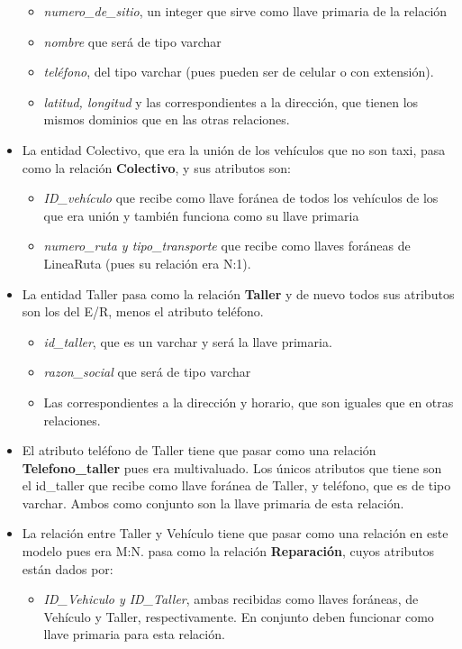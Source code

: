 \documentclass[11pt]{article}
\begin{document}
\begin{itemize}
    \begin{itemize}
    \item \textit{numero\_de\_sitio}, un integer que sirve como llave primaria de la relación
    \item \textit{nombre} que será de tipo varchar 
    \item \textit{teléfono}, del tipo varchar (pues pueden ser de celular o con extensión).
    \item \textit{latitud, longitud} y las correspondientes a la dirección, que tienen los mismos dominios que en las otras relaciones.
    \end{itemize}   
\item La entidad Colectivo, que era la unión de los vehículos que no son taxi, pasa como la relación \textbf{Colectivo}, y sus atributos son:
    \begin{itemize}
    \item \textit{ID\_vehículo} que recibe como llave foránea de todos los vehículos de los que era unión y también funciona como su llave primaria
    \item \textit{numero\_ruta y tipo\_transporte} que recibe como llaves foráneas de LineaRuta (pues su relación era N:1).
    \end{itemize}        
\item La entidad Taller pasa como la relación \textbf{Taller} y de nuevo todos sus atributos son los del E/R, menos el atributo teléfono.
    \begin{itemize}
    \item \textit{id\_taller}, que es un varchar y será la llave primaria.
    \item \textit{razon\_social} que será de tipo varchar
    \item Las correspondientes a la dirección y horario, que son iguales que en otras relaciones.
    \end{itemize}   
\item El atributo teléfono de Taller tiene que pasar como una relación \textbf{Telefono\_taller} pues era multivaluado. Los únicos atributos que tiene son el id\_taller que recibe como llave foránea de Taller, y teléfono, que es de tipo varchar. Ambos como conjunto son la llave primaria de esta relación.
\item La relación entre Taller y Vehículo tiene que pasar como una relación en este modelo pues era M:N. pasa como la relación \textbf{Reparación}, cuyos atributos están dados por:
    \begin{itemize}
        \item \textit{ID\_Vehiculo y ID\_Taller}, ambas recibidas como llaves foráneas, de Vehículo y Taller, respectivamente. En conjunto deben funcionar como llave primaria para esta relación.

\end{itemize}
\end{itemize}
\end{document}
